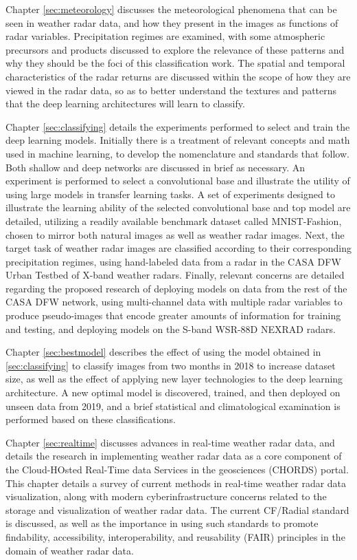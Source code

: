 Chapter \ref{sec:meteorology} discusses the meteorological phenomena that can be seen in weather radar data, and how they present in the images as functions of radar variables.
Precipitation regimes are examined, with some atmospheric precursors and products discussed to explore the relevance of these patterns and why they should be the foci of this classification work.
The spatial and temporal characteristics of the radar returns are discussed within the scope of how they are viewed in the radar data, so as to better understand the textures and patterns that the deep learning architectures will learn to classify.

Chapter \ref{sec:classifying} details the experiments performed to select and train the deep learning models.
Initially there is a treatment of relevant concepts and math used in machine learning, to develop the nomenclature and standards that follow.
Both shallow and deep networks are discussed in brief as necessary.
An experiment is performed to select a convolutional base and illustrate the utility of using large models in transfer learning tasks.
A set of experiments designed to illustrate the learning ability of the selected convolutional base and top model are detailed, utilizing a readily available benchmark dataset called MNIST-Fashion, chosen to mirror both natural images as well as weather radar images.
Next, the target task of weather radar images are classified according to their corresponding precipitation regimes, using hand-labeled data from a radar in the CASA DFW Urban Testbed of X-band weather radars.
Finally, relevant concerns are detailed regarding the proposed research of deploying models on data from the rest of the CASA DFW network, using multi-channel data with multiple radar variables to produce pseudo-images that encode greater amounts of information for training and testing, and deploying models on the S-band WSR-88D NEXRAD radars.

Chapter \ref{sec:bestmodel} describes the effect of using the model obtained in \ref{sec:classifying} to classify images from two months in 2018 to increase dataset size, as well as the effect of applying new layer technologies to the deep learning architecture.
A new optimal model is discovered, trained, and then deployed on unseen data from 2019, and a brief statistical and climatological examination is performed based on these classifications.

Chapter \ref{sec:realtime} discusses advances in real-time weather radar data, and details the research in implementing weather radar data as a core component of the Cloud-HOsted Real-Time data Services in the geosciences (CHORDS) portal.
This chapter details a survey of current methods in real-time weather radar data visualization, along with modern cyberinfrastructure concerns related to the storage and visualization of weather radar data.
The current CF/Radial standard is discussed, as well as the importance in using such standards to promote findability, accessibility, interoperability, and reusability (FAIR) principles in the domain of weather radar data.

